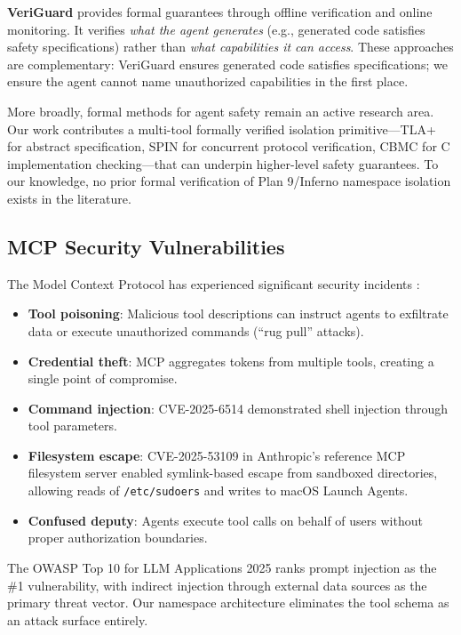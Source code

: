 \documentclass{article}
\begin{document}
\textbf{VeriGuard} \cite{veriguard2025} provides formal guarantees through offline verification and online monitoring. It verifies \textit{what the agent generates} (e.g., generated code satisfies safety specifications) rather than \textit{what capabilities it can access}. These approaches are complementary: VeriGuard ensures generated code satisfies specifications; we ensure the agent cannot name unauthorized capabilities in the first place.

More broadly, formal methods for agent safety remain an active research area. Our work contributes a multi-tool formally verified isolation primitive---TLA+ for abstract specification, SPIN for concurrent protocol verification, CBMC for C implementation checking---that can underpin higher-level safety guarantees. To our knowledge, no prior formal verification of Plan 9/Inferno namespace isolation exists in the literature.

\subsection{MCP Security Vulnerabilities}

The Model Context Protocol has experienced significant security incidents \cite{pillar2025mcp,willison2025mcp,unit42mcp2025}:

\begin{itemize}
    \item \textbf{Tool poisoning}: Malicious tool descriptions can instruct agents to exfiltrate data or execute unauthorized commands (``rug pull'' attacks).
    \item \textbf{Credential theft}: MCP aggregates tokens from multiple tools, creating a single point of compromise.
    \item \textbf{Command injection}: CVE-2025-6514 \cite{nvd2025cve6514} demonstrated shell injection through tool parameters.
    \item \textbf{Filesystem escape}: CVE-2025-53109 \cite{nvdCVE202553109} in Anthropic's reference MCP filesystem server enabled symlink-based escape from sandboxed directories, allowing reads of \texttt{/etc/sudoers} and writes to macOS Launch Agents.
    \item \textbf{Confused deputy}: Agents execute tool calls on behalf of users without proper authorization boundaries.
\end{itemize}

The OWASP Top 10 for LLM Applications 2025 \cite{owasp2025llm} ranks prompt injection as the \#1 vulnerability, with indirect injection through external data sources as the primary threat vector. Our namespace architecture eliminates the tool schema as an attack surface entirely.
\end{document}

